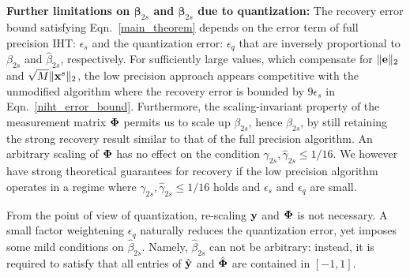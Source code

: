 \documentclass{article}
\begin{document}

{\bf Further limitations on ${\boldsymbol{\beta}}_{2s}$ and $\hat{\boldsymbol{\beta}}_{2s}$ due to quantization:} The recovery error bound satisfying Eqn.~\ref{main_theorem} depends on the error term of full precision IHT: $ {\epsilon_s}$ and the quantization error: $ {\epsilon}_q$ that are inversely proportional to ${\beta}_{2s}$ and $\hat{\beta}_{2s}$, respectively. For sufficiently large values, which compensate for $\|{\bf e}\|_2$ and $\sqrt{M} \|{\bf x}^s \|_2$, the low precision approach appears competitive with the unmodified algorithm where the recovery error is bounded by $9\epsilon_s$ in Eqn.~\ref{niht_error_bound}. Furthermore, the scaling-invariant property of the measurement matrix ${\bf \Phi}$ permits us to scale up ${\beta}_{2s}$, hence $\hat{\beta}_{2s}$, by still retaining the strong recovery result similar to that of the full precision algorithm. An arbitrary scaling of ${\bf \Phi}$ has no effect on the condition ${\gamma}_{2s}, \hat{\gamma}_{2s}\leq 1/16$. We however have strong theoretical guarantees for recovery if the low precision algorithm operates in a regime where ${\gamma}_{2s}, \hat{\gamma}_{2s}\leq 1/16$ holds and ${\epsilon}_s$  and ${\epsilon}_q$ are small.

From the  point of view of quantization, re-scaling ${\bf y}$ and ${\bf \Phi}$ is not necessary. A small factor weightening ${\epsilon}_q$ naturally reduces the quantization error, yet imposes some mild conditions on $\hat{\beta}_{2s}$. Namely, $\hat{\beta}_{2s}$ can not be arbitrary: instead, it is required to satisfy that all entries of $\hat {\bf y}$ and $\hat{\bf \Phi}$ are contained in $[-1, 1]$.
\end{document}
